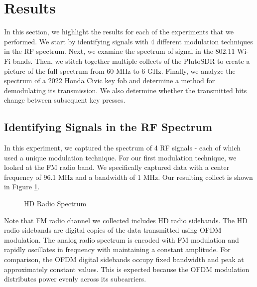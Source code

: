 \documentclass{article}
\begin{document}
\section{Results}

In this section, we highlight the results for each of the experiments that we performed. We start by identifying signals with 4 different modulation techniques in the RF spectrum. Next, we examine the spectrum of signal in the 802.11 Wi-Fi bands. Then, we stitch together multiple collects of the PlutoSDR to create a picture of the full spectrum from 60 MHz to 6 GHz. Finally, we analyze the spectrum of a 2022 Honda Civic key fob and determine a method for demodulating its transmission. We also determine whether the transmitted bits change between subsequent key presses.


\subsection{Identifying Signals in the RF Spectrum}

In this experiment, we captured the spectrum of 4 RF signals - each of which used a unique modulation technique. For our first modulation technique, we looked at the FM radio band. We specifically captured data with a center frequency of 96.1 MHz and a bandwidth of 1 MHz. Our resulting collect is shown in Figure \ref{fig::hd_radio_spectrum}.

\begin{figure}[H]
	\centerline{}
	\caption{HD Radio Spectrum}
	\label{fig::hd_radio_spectrum}
\end{figure}


Note that FM radio channel we collected includes HD radio sidebands. The HD radio sidebands are digital copies of the data transmitted using OFDM modulation. The analog radio spectrum is encoded with FM modulation and rapidly oscillates in frequency with maintaining a constant amplitude. For comparison, the OFDM digital sidebands occupy fixed bandwidth and peak at approximately constant values. This is expected because the OFDM modulation distributes power evenly across its subcarriers.
\end{document}

